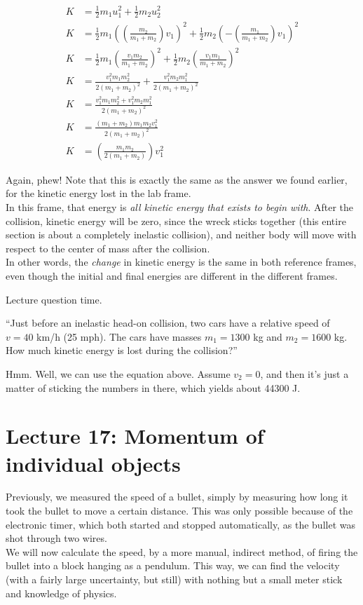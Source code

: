 \begin{align}
K &= \frac{1}{2} m_1 u_1^2 + \frac{1}{2} m_2 u_2^2\\
K &= \frac{1}{2} m_1 \left(\left(\frac{m_2}{m_1 + m_2}\right) v_1\right)^2 + \frac{1}{2} m_2 \left(- \left(\frac{m_1}{m_1 + m_2}\right) v_1\right)^2\\
K &= \frac{1}{2} m_1 \left(\frac{v_1 m_2}{m_1 + m_2}\right)^2 + \frac{1}{2} m_2 \left(\frac{v_1 m_1}{m_1 + m_2}\right)^2\\
K &= \frac{v_1^2 m_1 m_2^2}{2(m_1 + m_2)^2} + \frac{v_1^2 m_2 m_1^2}{2(m_1 + m_2)^2}\\
K &= \frac{v_1^2 m_1 m_2^2 + v_1^2 m_2 m_1^2}{2(m_1 + m_2)^2}\\
K &= \frac{(m_1 + m_2) m_1 m_2 v_1^2}{2(m_1 + m_2)^2}\\
K &= \left(\frac{m_1 m_2}{2(m_1 + m_2)}\right) v_1^2
\end{align}

Again, phew! Note that this is exactly the same as the answer we found earlier, for the kinetic energy lost in the lab frame.\\
In this frame, that energy is \emph{all kinetic energy that exists to begin with}. After the collision, kinetic energy will be zero, since the wreck sticks together (this entire section is about a completely inelastic collision), and neither body will move with respect to the center of mass after the collision.\\
In other words, the \emph{change} in kinetic energy is the same in both reference frames, even though the initial and final energies are different in the different frames.

Lecture question time.

``Just before an inelastic head-on collision, two cars have a relative speed of $v = 40$ km/h (25 mph). The cars have masses $m_1 = 1300$ kg and $m_2 = 1600$ kg.\\
How much kinetic energy is lost during the collision?''

Hmm. Well, we can use the equation above. Assume $v_2 = 0$, and then it's just a matter of sticking the numbers in there, which yields about 44300 J.

\section{Lecture 17: Momentum of individual objects}

Previously, we measured the speed of a bullet, simply by measuring how long it took the bullet to move a certain distance. This was only possible because of the electronic timer, which both started and stopped automatically, as the bullet was shot through two wires.\\
We will now calculate the speed, by a more manual, indirect method, of firing the bullet into a block hanging as a pendulum. This way, we can find the velocity (with a fairly large uncertainty, but still) with nothing but a small meter stick and knowledge of physics.

